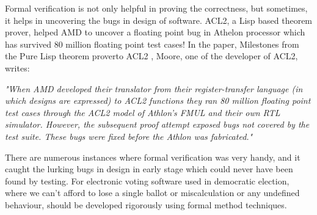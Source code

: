 	Formal verification is not only helpful in proving the correctness, 
	but sometimes, it helps in uncovering the bugs in design of
	software. ACL2, a Lisp based theorem prover, helped 
	AMD to uncover a floating point bug in Athelon processor which 
	has survived 80 million floating point test cases! 
	In the paper, Milestones from the Pure Lisp theorem proverto ACL2
	\cite{Moore2019}, Moore, one of the developer of ACL2, writes:
	
	\textit{"When AMD developed their translator 
	from their register-transfer language (in which designs
	are expressed) to ACL2 functions they ran 80 million 
	floating point test cases through the ACL2 model of 
	Athlon’s FMUL and their own RTL simulator. However, the 
	subsequent proof attempt exposed bugs not covered by the
	test suite. These bugs were fixed before the Athlon was 
	fabricated."}
	
	There are numerous instances where formal verification 
	was very handy, and it caught the lurking bugs in design in early 
	stage which could never have been found by testing. For 
	electronic voting software used in democratic election, where we 
	can't afford to lose a single ballot or miscalculation 
	or any undefined behaviour, should be developed 
	rigorously using formal method techniques.  
	
	
%       
%       
		
